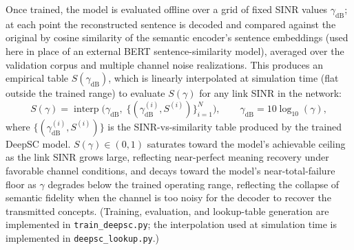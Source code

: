 \documentclass[journal,onecolumn]{IEEEtran}
\begin{document}
Once trained, the model is evaluated offline over a grid of fixed SINR values $\gamma_{\text{dB}}$; at each point the reconstructed sentence is decoded and compared against the original by cosine similarity of the semantic encoder's sentence embeddings (used here in place of an external BERT sentence-similarity model), averaged over the validation corpus and multiple channel noise realizations. This produces an empirical table $S(\gamma_{\text{dB}})$, which is linearly interpolated at simulation time (flat outside the trained range) to evaluate $S(\gamma)$ for any link SINR in the network:
\begin{equation}
    S(\gamma) = \operatorname{interp}\big(\gamma_{\text{dB}},\; \{(\gamma_{\text{dB}}^{(i)}, S^{(i)})\}_{i=1}^{N}\big), \qquad \gamma_{\text{dB}} = 10\log_{10}(\gamma),
\end{equation}
where $\{(\gamma_{\text{dB}}^{(i)}, S^{(i)})\}$ is the SINR-vs-similarity table produced by the trained DeepSC model. $S(\gamma) \in (0,1)$ saturates toward the model's achievable ceiling as the link SINR grows large, reflecting near-perfect meaning recovery under favorable channel conditions, and decays toward the model's near-total-failure floor as $\gamma$ degrades below the trained operating range, reflecting the collapse of semantic fidelity when the channel is too noisy for the decoder to recover the transmitted concepts. (Training, evaluation, and lookup-table generation are implemented in \texttt{train\_deepsc.py}; the interpolation used at simulation time is implemented in \texttt{deepsc\_lookup.py}.)
\end{document}
